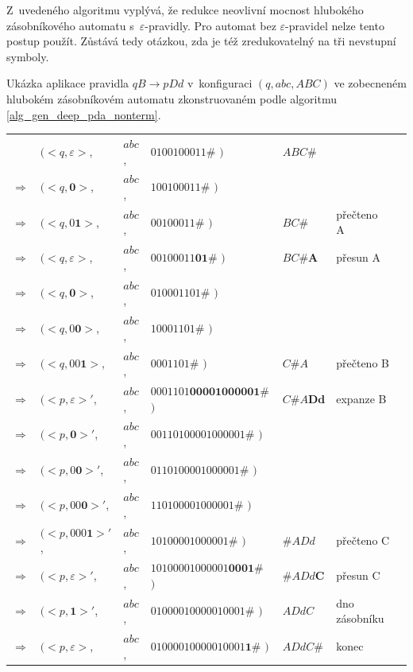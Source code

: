 Z~uvedeného algoritmu vyplývá, že redukce neovlivní mocnost hlubokého zásobníkového automatu s~$\varepsilon$-pravidly. Pro automat bez $\varepsilon$-pravidel nelze tento postup použít. Zůstává tedy otázkou, zda je též zredukovatelný na tři nevstupní symboly.


\begin{Example}
Ukázka aplikace pravidla $qB \rightarrow p Dd$ v~konfiguraci $(q, abc, ABC)$ ve zobecneném hlubokém zásobníkovém automatu zkonstruovaném podle algoritmu \ref{alg_gen_deep_pda_nonterm}.

\begin{center}
\begin{tabular}{llll|l|ll}
                & $( <q, \varepsilon>$,  & $abc$, & $0100100011\#$         $)$ & $ABC\#$ \\
$\Rightarrow$   & $( <q, \mathbf{0}>$,            & $abc$, & $100100011\#$         $)$ & \\
$\Rightarrow$   & $( <q, 0\mathbf{1}>$,           & $abc$, & $00100011\#$         $)$ &   $BC\#$ & přečteno A~\\
$\Rightarrow$   & $( <q, \varepsilon>$,  & $abc$, & $00100011\mathbf{01}\#$         $)$ & $BC\#\mathbf{A}$ & přesun A~\\
$\Rightarrow$   & $( <q, \mathbf{0}>$,            & $abc$, & $010001101\#$         $)$ & \\
$\Rightarrow$   & $( <q, 0\mathbf{0}>$,           & $abc$, & $10001101\#$         $)$ & \\
$\Rightarrow$   & $( <q, 00\mathbf{1}>$,          & $abc$, & $0001101\#$         $)$ &    $C\#A$ & přečteno B \\
$\Rightarrow$   & $( <p,\varepsilon>'$,   & $abc$, & $0001101\mathbf{00001000001}\#$         $)$ & $C\#A\mathbf{Dd}$ & expanze B \\
$\Rightarrow$   & $( <p,\mathbf{0}>'$,   & $abc$, & $00110100001000001\#$         $)$ & \\
$\Rightarrow$   & $( <p,0\mathbf{0}>'$,   & $abc$, & $0110100001000001\#$         $)$ & \\
$\Rightarrow$   & $( <p,00\mathbf{0}>'$,   & $abc$, & $110100001000001\#$         $)$ & \\
$\Rightarrow$   & $( <p,000\mathbf{1}>'$,   & $abc$, & $10100001000001\#$         $)$ & $\#ADd$ & přečteno C  \\
$\Rightarrow$   & $( <p,\varepsilon>'$,   & $abc$, & $10100001000001\mathbf{0001}\#$         $)$ & $\#ADd\mathbf{C}$ & přesun C \\
$\Rightarrow$   & $( <p,\mathbf{1}>'$,   & $abc$, & $01000010000010001\#$         $)$ & $ADdC$ & dno zásobníku \\
$\Rightarrow$   & $( <p,\varepsilon>$,   & $abc$, & $01000010000010001\mathbf{1}\#$         $)$ & $ADdC\mathbf{\#}$ & konec


\end{tabular}
\end{center}


\end{Example}

